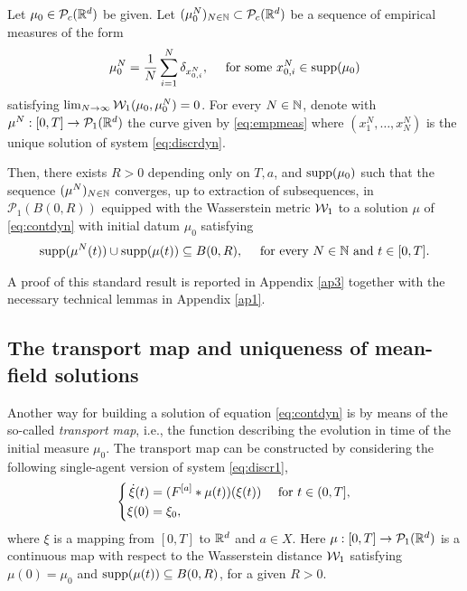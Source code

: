 \begin{proposition}\label{pr:exist}
Let $\mu_0 \in \mathcal{P}_c(\mathbb{R}^d)$ be given. Let $(\mu^{N}_0)_{N \in \mathbb{N}} \subset \mathcal{P}_c(\mathbb{R}^d)$ be a sequence of empirical measures of the form
\begin{align*}
\mu^{N}_0 = \frac{1}{N}\sum^N_{i = 1} \delta_{x^{N}_{0,i}}, \quad \text{ for some } x^{N}_{0,i} \in \operatorname{supp}(\mu_0)
\end{align*}
satisfying $\lim_{N \rightarrow \infty} \mathcal{W}_1(\mu_0,\mu^{N}_0) = 0$. For every $N \in \mathbb{N}$, denote with $\mu^N:[0,T] \rightarrow \mathcal{P}_1(\mathbb{R}^{d})$ the curve given by \eqref{eq:empmeas} where $(x^N_1,\ldots,x^N_N)$ is the unique solution of system \eqref{eq:discrdyn}.

Then, there exists $R > 0$ depending only on $T,a$, and $\operatorname{supp}(\mu_0)$ such that the sequence $(\mu^N)_{N \in \mathbb{N}}$ converges, up to extraction of subsequences, in $\mathcal{P}_1(B(0,R))$ equipped with the Wasserstein metric $\mathcal{W}_1$ to a solution $\mu$ of \eqref{eq:contdyn} with initial datum $\mu_0$ satisfying
\begin{align*}
\operatorname{supp}(\mu^N(t)) \cup \operatorname{supp}(\mu(t)) \subseteq B(0,R), \quad \text{ for every } N \in \mathbb{N} \text{ and } t \in [0,T].
\end{align*}
\end{proposition}

 A proof of this standard result is reported in Appendix \ref{ap3} together with the necessary technical lemmas in Appendix \ref{ap1}.

\subsection{The transport map and  uniqueness of mean-field solutions}

Another way for building a solution of equation \eqref{eq:contdyn} is by means of the so-called \textit{transport map}, i.e., the function describing the evolution in time of the initial measure $\mu_0$. The transport map can be constructed by considering the following single-agent version of system \eqref{eq:discr1},
\begin{align}\label{eq:transpdyn}
\left\{\begin{aligned}
\dot{\xi}(t) &= (F^{[a]}*\mu(t))(\xi(t)) \quad \text{ for } t \in (0,T],\\
\xi(0) &= \xi_0,
\end{aligned}\right.
\end{align}
where $\xi$ is a mapping from $[0,T]$ to $\mathbb{R}^d$ and $a \in X$. Here $\mu:[0,T]\rightarrow\mathcal{P}_1(\mathbb{R}^d)$ is a continuous map with respect to the Wasserstein distance $\mathcal{W}_1$ satisfying $\mu(0) = \mu_0$ and $\operatorname{supp}(\mu(t)) \subseteq B(0,R)$, for a given $R>0$.%

